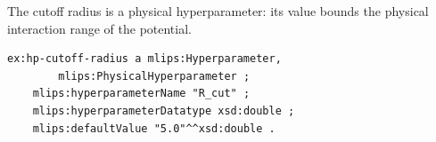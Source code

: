 The cutoff radius is a physical hyperparameter: its value bounds the
physical interaction range of the potential.
\begin{lstlisting}[language=turtle]
ex:hp-cutoff-radius a mlips:Hyperparameter,
        mlips:PhysicalHyperparameter ;
    mlips:hyperparameterName "R_cut" ;
    mlips:hyperparameterDatatype xsd:double ;
    mlips:defaultValue "5.0"^^xsd:double .
\end{lstlisting}
